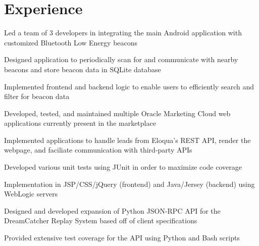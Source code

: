 \documentclass[letterpaper]{deedy-resume}
\begin{document}
\hfill
%
%
\begin{minipage}[t]{0.66\textwidth}

\section{Experience}


\vspace{\topsep}
\begin{tightitemize}
\item Led a team of 3 developers in integrating the main Android application with customized Bluetooth Low Energy beacons
\item Designed application to periodically scan for and communicate with nearby beacons and store beacon data in SQLite database
\item Implemented frontend and backend logic to enable users to efficiently search and filter for beacon data
\end{tightitemize}

\sectionspace


\begin{tightitemize}
\item Developed, tested, and maintained multiple Oracle Marketing Cloud web applications currently present in the marketplace
\item Implemented applications to handle leads from Eloqua's REST API, render the webpage, and faciliate communication with third-party APIs
\item Developed various unit tests using JUnit in order to maximize code coverage
\item Implementation in JSP/CSS/jQuery (frontend) and Java/Jersey (backend) using WebLogic servers
\end{tightitemize}

\sectionspace


\begin{tightitemize}
\item Designed and developed expansion of Python JSON-RPC API for the DreamCatcher Replay System based off of client specifications
\item Provided extensive test coverage for the API using Python and Bash scripts
\end{tightitemize}


\end{minipage}
\end{document}
